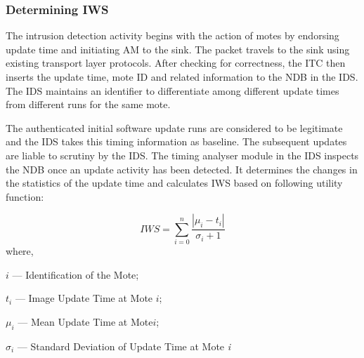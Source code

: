 \documentclass[conference,final]{IEEEtran}
\begin{document}
\subsubsection{Determining IWS}
\label{ssc:cal_iws}


The intrusion detection activity begins with the action of motes by endorsing update time and initiating AM to the sink. 
The packet travels to the sink using existing transport layer protocols.
After checking for correctness, the ITC then inserts the update time, mote ID and related information to the NDB in the IDS.
The IDS maintains an identifier to differentiate among different update times from different runs for the same mote.
%

The authenticated initial software update runs are considered to be legitimate and the IDS takes this timing information as baseline.
The subsequent updates are liable to scrutiny by the IDS.
The timing analyser module in the IDS inspects the NDB once an update activity has been detected.
It determines the changes in the statistics of the update time and calculates IWS based on following utility function:

\begin{equation}
\label{eqn2} 
	\mathit{IWS} = \sum \limits_{i=0}^{n} \frac{\left| \mu_i - t_i \right|}{\sigma_i + 1}
	\end{equation}
where, 
\begin{inparaenum}
\item $\mathit{i}$ --- Identification of the Mote;  
\item $\mathit{t_i}$ --- Image Update Time at Mote $\mathit{i}$; 
\item $\mathit{\mu_i}$ --- Mean Update Time at Mote$\mathit{i}$; 
\item $\mathit{\sigma_i}$ --- Standard Deviation of Update Time at Mote \emph{i} 
\end{inparaenum}	
\end{document}
